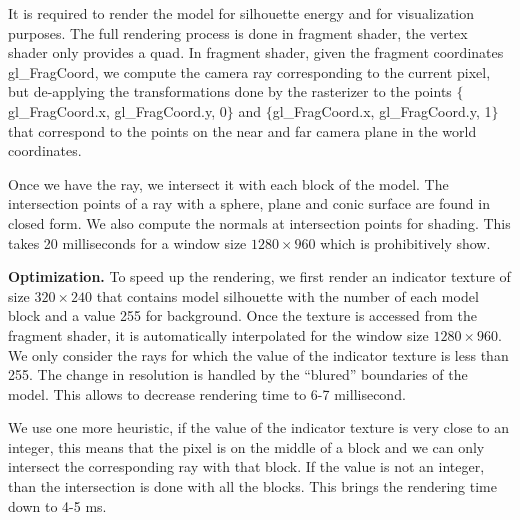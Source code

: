 \begin{DRAFT}
It is required to render the model for silhouette energy and for visualization purposes. The full rendering process is done in fragment shader, the vertex shader only provides a quad. 
In fragment shader, given the fragment coordinates gl\_FragCoord, we compute the camera ray corresponding to the current pixel, but de-applying the transformations done by the rasterizer to the points $\{$gl\_FragCoord.x, gl\_FragCoord.y, 0$\}$ and $\{$gl\_FragCoord.x, gl\_FragCoord.y, 1$\}$ that correspond to the points on the near and far camera plane in the world coordinates.

Once we have the ray, we intersect it with each block of the model. The intersection points of a ray with a sphere, plane and conic surface are found in closed form. We also compute the normals at intersection points for shading. This takes 20 milliseconds for a window size $1280 \times 960$ which is prohibitively show.

\textbf{Optimization.} To speed up the rendering, we first render an indicator texture of size $320 \times 240$ that contains model silhouette with the number of each model block and a value 255 for background. Once the texture is accessed from the fragment shader, it is automatically interpolated for the window size  $1280 \times 960$. We only consider the rays for which the value of the indicator texture is less than 255. The change in resolution is handled by the ``blured'' boundaries of the model. This allows to decrease rendering time to 6-7 millisecond. 

We use one more heuristic, if the value of the indicator texture is very close to an integer, this means that the pixel is on the middle of a block and we can only intersect the corresponding ray with that block. If the  value is not an integer, than the intersection is done with all the blocks. This brings the rendering time down to 4-5 ms. 
\end{DRAFT}

